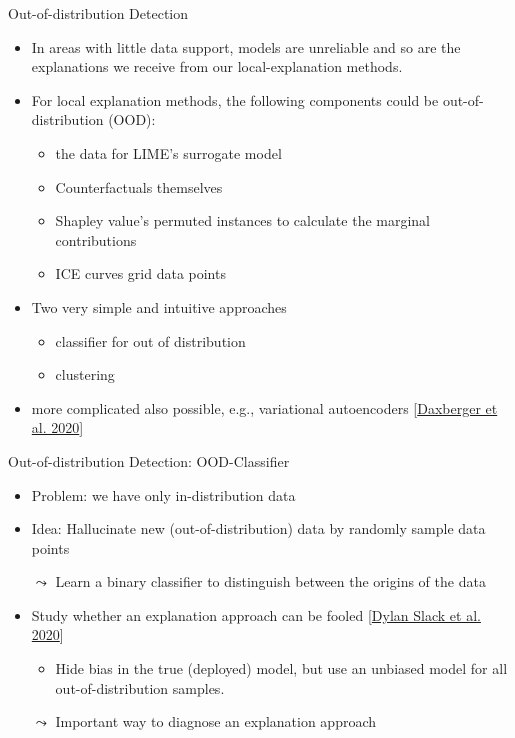 \documentclass[11pt,compress,t,notes=noshow, aspectratio=169, xcolor=table]{beamer}
\begin{document}
\begin{vbframe}[c]{Out-of-distribution Detection}
	\begin{itemize}
		\item In areas with little data support, models are unreliable and so are the explanations we receive from our local-explanation methods.
		\item For local explanation methods, the following components could be out-of-distribution (OOD): 
		\begin{itemize}
			\item the data for LIME's surrogate model
			\item Counterfactuals themselves
			\item Shapley value's permuted instances to calculate the marginal contributions 
			\item ICE curves grid data points 
		\end{itemize}
		\item Two very simple and intuitive approaches
		\begin{itemize}
		    \item classifier for out of distribution
		    \item clustering
		\end{itemize}
		\item more complicated also possible, e.g., variational autoencoders [\href{https://arxiv.org/abs/1912.05651}{Daxberger et al. 2020}]
	\end{itemize}
\end{vbframe}


\begin{vbframe}[c]{Out-of-distribution Detection: OOD-Classifier}
	\begin{itemize}
	    \item Problem: we have only in-distribution data
	    \item Idea: Hallucinate new (out-of-distribution) data by randomly sample data points
	    \item[$\leadsto$] Learn a binary classifier to distinguish between the origins of the data
	    \medskip
	    \pause
	    \item Study whether an explanation approach can be fooled [\href{https://arxiv.org/abs/1911.02508}{Dylan Slack et al. 2020}]
	    \begin{itemize}
	        \item Hide bias in the true (deployed) model, but use an unbiased model for all out-of-distribution samples.
	    \end{itemize}
	    \item[$\leadsto$] Important way to diagnose an explanation approach
	\end{itemize}
\end{vbframe}
\end{document}
